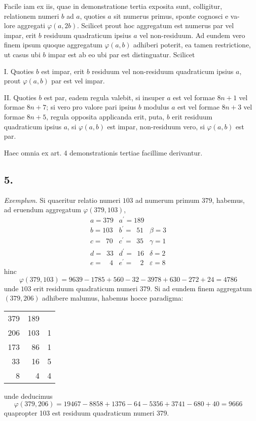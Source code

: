 \documentclass[twoside,12pt, showframe]{memoir}
\begin{document}
Facile iam ex iis, quae in demonstratione tertia exposita sunt, colligitur, relationem numeri \(b\) ad \(a\), quoties \(a\) sit numerus primus, sponte cognosci e va-\clearpage\noindent%
lore aggregati \(\varphi(a, 2 b)\). Scilicet prout hoc aggregatum est numerus par vel impar, erit \(b\) residuum quadraticum ipsius \(a\) vel non-residuum. Ad eundem vero finem ipsum quoque aggregatum \(\varphi(a, b)\) adhiberi poterit, ea tamen restrictione, ut casus ubi \(b\) impar est ab eo ubi par est distinguatur. Scilicet
 
I. Quoties \(b\) est impar, erit \(b\) residuum vel non-residuum quadraticum ipsius \(a\), prout \(\varphi(a, b)\) par est vel impar.
 
II. Quoties \(b\) est par, eadem regula valebit, si insuper \(a\) est vel formae \(8 n+1\) vel formae \(8 n+7\); si vero pro valore pari ipsius \(b\) modulus \(a\) est vel formae \(8 n+3\) vel formae \(8 n+5\), regula opposita applicanda erit, puta, \(b\) erit residuum quadraticum ipsius \(a\), si \(\varphi(a, b)\) est impar, non-residuum vero, si \(\varphi(a, b)\) est par.
 
Haec omnia ex art. 4 demonstrationis tertiae facillime derivantur.

\subsection*{5.}
 
\textit{Exemplum.} Si quaeritur relatio numeri \(103\) ad numerum primum \(379\), habemus, ad eruendum aggregatum \(\varphi(379,103)\),
\[\begin{array}{r|r|r}
a= 379 & a^{\prime}=189 & \\
b= 103 & b^{\prime}=\phantom{0}51 & \beta=3 \\
c= \phantom{0}70 & c^{\prime}=\phantom{0}35 & \gamma=1 \\
d= \phantom{0}33 & d^{\prime}=\phantom{0}16 & \delta=2 \\
e= \phantom{00}4 & e^{\prime}=\phantom{00}2 & \varepsilon=8
\end{array}\]
hinc
\[\varphi(379,103)=9639-1785+560-32-3978+630-272+24=4786\]
unde \(103\) erit residuum quadraticum numeri \(379\). Si ad eundem finem aggregatum \((379,206)\) adhibere malumus, habemus hocce paradigma:
\begin{center}
\begin{tabular}{r|r|r}
379 & 189 &  \\
206 & 103 & 1 \\
173 & 86 & 1 \\
33 & 16 & 5 \\
8 & 4 & 4 \\
\end{tabular}
\end{center}
unde deducimus\clearpage\noindent%
\[\varphi(379,206)=19467-8858+1376-64-5356+3741-680+40=9666\]
quapropter 103 est residuum quadraticum numeri 379.
\end{document}
